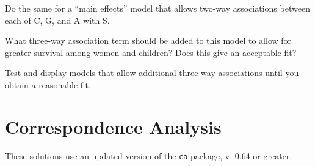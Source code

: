 \documentclass[10pt]{report}\usepackage[]{graphicx}\usepackage[]{color}
\begin{document}
\begin{Exercises}
\begin{enumerate*}
      \item Do the same for a ``main effects'' model that allows two-way associations between each of C, G, and A with S.
      \begin{ans}
      \end{ans}
      
      \item What three-way association term should be added to this model to allow for greater survival among women and children?
      Does this give an acceptable fit?
      \begin{ans}
      \end{ans}
      
      \item Test and display models that allow additional three-way associations until you obtain 
      a reasonable fit.
      \begin{ans}
      \end{ans}
      
    \end{enumerate*}
  
\end{Exercises}


\chapter{Correspondence Analysis}\label{ch:corresp}

These solutions use an updated version of the \texttt{ca} package, v. 0.64 or greater.
\end{document}

